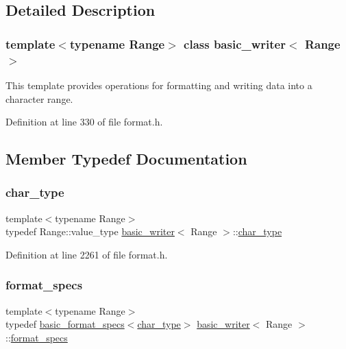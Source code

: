 \subsection{Detailed Description}
\subsubsection*{template$<$typename Range$>$\newline
class basic\+\_\+writer$<$ Range $>$}

This template provides operations for formatting and writing data into a character range. 

Definition at line 330 of file format.\+h.



\subsection{Member Typedef Documentation}
\mbox{\label{classbasic__writer_ad6f1b4f79aa917bb28c4f4a37fabf0b7}} 
\subsubsection{\texorpdfstring{char\+\_\+type}{char\_type}}
{\footnotesize\ttfamily template$<$typename Range$>$ \\
typedef Range\+::value\+\_\+type \hyperlink{classbasic__writer}{basic\+\_\+writer}$<$ Range $>$\+::\hyperlink{classbasic__writer_ad6f1b4f79aa917bb28c4f4a37fabf0b7}{char\+\_\+type}}



Definition at line 2261 of file format.\+h.

\mbox{\label{classbasic__writer_ad0e2925cf7d02e0ccb6da44c06d64e55}} 
\subsubsection{\texorpdfstring{format\+\_\+specs}{format\_specs}}
{\footnotesize\ttfamily template$<$typename Range$>$ \\
typedef \hyperlink{structbasic__format__specs}{basic\+\_\+format\+\_\+specs}$<$\hyperlink{classbasic__writer_ad6f1b4f79aa917bb28c4f4a37fabf0b7}{char\+\_\+type}$>$ \hyperlink{classbasic__writer}{basic\+\_\+writer}$<$ Range $>$\+::\hyperlink{classbasic__writer_ad0e2925cf7d02e0ccb6da44c06d64e55}{format\+\_\+specs}}



